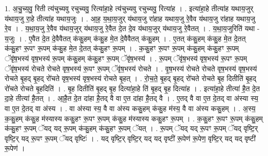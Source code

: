 \documentclass[17pt]{extarticle}
\begin{document}
1. अ॒चु॒च्य॒वु॒ रिती त्य॑चुच्यवु रचुच्यवु॒ रित्या॑हा॒हे त्य॑चुच्यवु रचुच्यवु॒ रित्या॑ह । . इत्या॑हा॒हे तीत्या॑ह यथाय॒जुर् य॑थाय॒जु रा॒हे तीत्या॑ह यथाय॒जुः । . आ॒ह॒ य॒था॒य॒जुर् य॑थाय॒जु रा॑हाह यथाय॒जु रे॒वैव य॑थाय॒जु रा॑हाह यथाय॒जु रे॒व । . य॒था॒य॒जु रे॒वैव य॑थाय॒जुर् य॑थाय॒जु रे॒वैत दे॒त दे॒व य॑थाय॒जुर् य॑थाय॒जु रे॒वैतत् । . य॒था॒य॒जुरिति॑ यथा - य॒जुः । . ए॒वैत दे॒त दे॒वैवैतत् क॑कु॒हम् क॑कु॒ह मे॒त दे॒वैवैतत् क॑कु॒हम् । . ए॒तत् क॑कु॒हम् क॑कु॒ह मे॒त दे॒तत् क॑कु॒हꣳ रू॒पꣳ रू॒पम् क॑कु॒ह मे॒त दे॒तत् क॑कु॒हꣳ रू॒पम् । . क॒कु॒हꣳ रू॒पꣳ रू॒पम् क॑कु॒हम् क॑कु॒हꣳ रू॒पम् ॅवृ॑ष॒भस्य॑ वृष॒भस्य॑ रू॒पम् क॑कु॒हम् क॑कु॒हꣳ रू॒पम् ॅवृ॑ष॒भस्य॑ । . रू॒पम् ॅवृ॑ष॒भस्य॑ वृष॒भस्य॑ रू॒पꣳ रू॒पम् ॅवृ॑ष॒भस्य॑ रोचते रोचते वृष॒भस्य॑ रू॒पꣳ रू॒पम् ॅवृ॑ष॒भस्य॑ रोचते । . वृ॒ष॒भस्य॑ रोचते रोचते वृष॒भस्य॑ वृष॒भस्य॑ रोचते बृ॒हद् बृ॒हद् रो॑चते वृष॒भस्य॑ वृष॒भस्य॑ रोचते बृ॒हत् । . रो॒च॒ते॒ बृ॒हद् बृ॒हद् रो॑चते रोचते बृ॒ह दितीति॑ बृ॒हद् रो॑चते रोचते बृ॒हदिति॑ । . बृ॒ह दितीति॑ बृ॒हद् बृ॒ह दित्या॑हा॒हे ति॑ बृ॒हद् बृ॒ह दित्या॑ह । . इत्या॑हा॒हे तीत्या॑ है॒त दे॒त दा॒हे तीत्या॑ है॒तत् । . आ॒है॒त दे॒त दा॑हा है॒तद् वै वा ए॒त दा॑हा है॒तद् वै । . ए॒तद् वै वा ए॒त दे॒तद् वा अ॑स्या स्य॒ वा ए॒त दे॒तद् वा अ॑स्य । . वा अ॑स्या स्य॒ वै वा अ॑स्य ककु॒हम् क॑कु॒ह म॑स्य॒ वै वा अ॑स्य ककु॒हम् । . अ॒स्य॒ क॒कु॒हम् क॑कु॒ह म॑स्यास्य ककु॒हꣳ रू॒पꣳ रू॒पम् क॑कु॒ह म॑स्यास्य ककु॒हꣳ रू॒पम् । . क॒कु॒हꣳ रू॒पꣳ रू॒पम् क॑कु॒हम् क॑कु॒हꣳ रू॒पम् ॅयद् यद् रू॒पम् क॑कु॒हम् क॑कु॒हꣳ रू॒पम् ॅयत् । . रू॒पम् ॅयद् यद् रू॒पꣳ रू॒पम् ॅयद् वृष्टि॒र् वृष्टि॒र् यद् रू॒पꣳ रू॒पम् ॅयद् वृष्टिः॑ । . यद् वृष्टि॒र् वृष्टि॒र् यद् यद् वृष्टी॑ रू॒पेण॑ रू॒पेण॒ वृष्टि॒र् यद् यद् वृष्टी॑ रू॒पेण॑ । \newline
\end{document}
